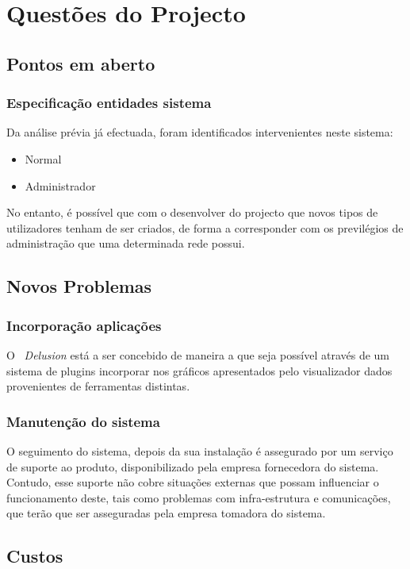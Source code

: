 \chapter{Questões do Projecto}
\minitoc
\section{Pontos em aberto}

\subsection{Especificação entidades sistema}
Da análise prévia já efectuada, foram identificados intervenientes neste sistema:

\begin{itemize} 
\item Normal
\item Administrador
\end{itemize}

No entanto, é possível que com o desenvolver do projecto que novos tipos de utilizadores tenham de ser criados, de forma a corresponder com os previlégios de administração que uma determinada rede possui.
\section{Novos Problemas}

\subsection{Incorporação aplicações}

O ~\textit{Delusion} está a ser concebido de maneira a que seja possível através de um sistema de plugins incorporar nos gráficos apresentados pelo visualizador dados provenientes de ferramentas distintas.

\subsection{Manutenção do sistema}
O seguimento do sistema, depois da sua instalação é assegurado por um serviço de suporte ao produto, disponibilizado pela empresa fornecedora do sistema. Contudo, esse suporte não cobre situações externas que possam influenciar o funcionamento deste, tais como problemas com infra-estrutura e comunicações, que terão que ser asseguradas pela empresa tomadora do sistema. 

 
\section{Custos}

